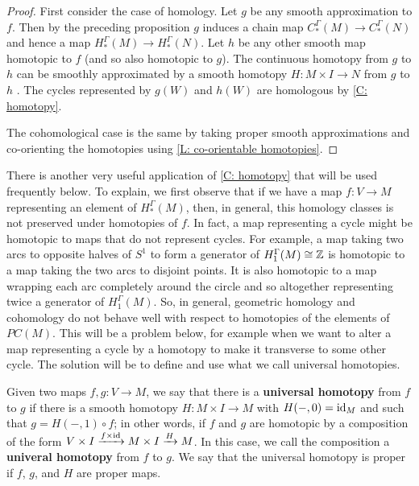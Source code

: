 \begin{proof}
	First consider the case of homology.
	Let $g$ be any smooth approximation to $f$.
	Then by the preceding proposition $g$ induces a chain map $C_*^\Gamma(M) \to C_*^\Gamma(N)$ and hence a map $H_*^\Gamma(M) \to H_*^\Gamma(N)$.
	Let $h$ be any other smooth map homotopic to $f$ (and so also homotopic to $g$).
	The continuous homotopy from $g$ to $h$ can be smoothly approximated by a smooth homotopy $H \colon M \times I \to N$ from $g$ to $h$ \cite[Theorem III.2.5]{Kos93}.
	The cycles represented by $g(W)$ and $h(W)$ are homologous by \cref{C: homotopy}.

	The cohomological case is the same by taking proper smooth approximations and co-orienting the homotopies using \cref{L: co-orientable homotopies}.
\end{proof}



There is another very useful application of \cref{C: homotopy} that will be used frequently below. To explain, we first observe that if we have a map $f \colon V\to M$ representing an element of $H_*^\Gamma(M)$, then, in general, this homology classes is not preserved under homotopies of $f$. In fact, a map representing a cycle might be homotopic to maps that do not represent cycles. For example, a map taking two arcs to opposite halves of $S^1$ to form a generator of $H_1^\Gamma(M)\cong \mathbb{Z}$ is homotopic to a map taking the two arcs to disjoint points. It is also homotopic to a map wrapping each arc completely around the circle and so altogether representing twice a generator of $H_1^\Gamma(M)$. So, in general, geometric homology and cohomology do not behave well with respect to homotopies of the elements of $PC(M)$. This will be a problem below, for example when we want to alter a map representing a cycle by a homotopy to make it transverse to some other cycle. The solution will be to define and use what we call universal homotopies.


\begin{definition}\label{D: universal homotopy}
Given two maps $f,g \colon V\to M$, we say that there is a \textbf{universal homotopy} from $f$ to $g$ if there is a smooth homotopy $H \colon M\times I\to M$ with $H(-,0)=\mathrm{id}_M$ and such that $g=H(-,1)\circ f$; in other words, if  $f$ and $g$ are homotopic by a  composition of the form  $V \times I \xrightarrow{f\times \mathrm{id}} M \times I \xrightarrow{H} M$. In this case, we call the composition a \textbf{univeral homotopy} from $f$ to $g$. We say that the universal homotopy is proper if $f$, $g$, and $H$ are proper maps.
\end{definition}


